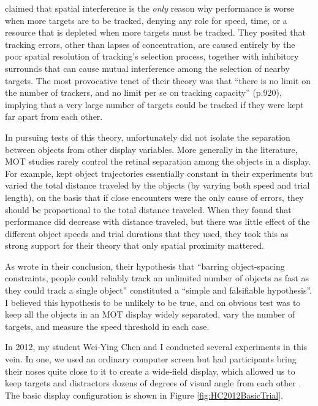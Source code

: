 \documentclass[
]{book}
\begin{document}
\citet{franconeriTrackingMultipleObjects2010a} claimed that spatial interference is the \emph{only} reason why performance is worse when more targets are to be tracked, denying any role for speed, time, or a resource that is depleted when more targets must be tracked. They posited that tracking errors, other than lapses of concentration, are caused entirely by the poor spatial resolution of tracking's selection process, together with inhibitory surrounds that can cause mutual interference among the selection of nearby targets. The most provocative tenet of their theory was that ``there is no limit on the number of trackers, and no limit per se on tracking capacity'' (p.920), implying that a very large number of targets could be tracked if they were kept far apart from each other.

In pursuing tests of this theory, \citet{franconeriTrackingMultipleObjects2010a} unfortunately did not isolate the separation between objects from other display variables. More generally in the literature, MOT studies rarely control the retinal separation among the objects in a display. For example, \citet{franconeriTrackingMultipleObjects2010a} kept object trajectories essentially constant in their experiments but varied the total distance traveled by the objects (by varying both speed and trial length), on the basis that if close encounters were the only cause of errors, they should be proportional to the total distance traveled. When they found that performance did decrease with distance traveled, but there was little effect of the different object speeds and trial durations that they used, they took this as strong support for their theory that only spatial proximity mattered.

As \citet{franconeriTrackingMultipleObjects2010a} wrote in their conclusion, their hypothesis that ``barring object-spacing constraints, people could reliably track an unlimited number of objects as fast as they could track a single object'' constituted a ``simple and falsifiable hypothesis''. I believed this hypothesis to be unlikely to be true, and on obvious test was to keep all the objects in an MOT display widely separated, vary the number of targets, and measure the speed threshold in each case.

In 2012, my student Wei-Ying Chen and I conducted several experiments in this vein. In one, we used an ordinary computer screen but had participants bring their noses quite close to it to create a wide-field display, which allowed us to keep targets and distractors dozens of degrees of visual angle from each other \citet{holcombeExhaustingAttentionalTracking2012}. The basic display configuration is shown in Figure \ref{fig:HC2012BasicTrial}.
\end{document}
